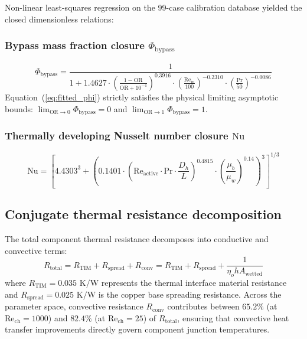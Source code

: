 Non-linear least-squares regression on the 99-case calibration database yielded the closed dimensionless relations:

\subsubsection{Bypass mass fraction closure $\Phi_{\mathrm{bypass}}$}
\begin{equation}
\Phi_{\mathrm{bypass}} = \frac{1}{1 + 1.4627 \cdot \left(\frac{1 - \mathrm{OR}}{\mathrm{OR} + 10^{-4}}\right)^{0.3916} \cdot \left(\frac{\mathrm{Re}_{\mathrm{in}}}{100}\right)^{-0.2310} \cdot \left(\frac{\mathrm{Pr}}{50}\right)^{-0.0086}}
\label{eq:fitted_phi}
\end{equation}
Equation~(\ref{eq:fitted_phi}) strictly satisfies the physical limiting asymptotic bounds: $\lim_{\mathrm{OR}\to 0}\Phi_{\mathrm{bypass}} = 0$ and $\lim_{\mathrm{OR}\to 1}\Phi_{\mathrm{bypass}} = 1$.

\subsubsection{Thermally developing Nusselt number closure $\mathrm{Nu}$}
\begin{equation}
\mathrm{Nu} = \left[ 4.4303^3 + \left( 0.1401 \cdot \left(\mathrm{Re}_{\mathrm{active}} \cdot \mathrm{Pr} \cdot \frac{D_h}{L}\right)^{0.4815} \cdot \left(\frac{\mu_b}{\mu_w}\right)^{0.14} \right)^3 \right]^{1/3}
\label{eq:fitted_nu}
\end{equation}

\subsection{Conjugate thermal resistance decomposition}
\label{sec:thermal_decomposition}

The total component thermal resistance decomposes into conductive and convective terms:
\begin{equation}
R_{\mathrm{total}} = R_{\mathrm{TIM}} + R_{\mathrm{spread}} + R_{\mathrm{conv}} = R_{\mathrm{TIM}} + R_{\mathrm{spread}} + \frac{1}{\eta_o h A_{\mathrm{wetted}}}
\label{eq:thermal_decomposition}
\end{equation}
where $R_{\mathrm{TIM}} = 0.035\text{ K/W}$ represents the thermal interface material resistance and $R_{\mathrm{spread}} = 0.025\text{ K/W}$ is the copper base spreading resistance. Across the parameter space, convective resistance $R_{\mathrm{conv}}$ contributes between $65.2\%$ (at $\mathrm{Re}_{\mathrm{ch}}=1000$) and $82.4\%$ (at $\mathrm{Re}_{\mathrm{ch}}=25$) of $R_{\mathrm{total}}$, ensuring that convective heat transfer improvements directly govern component junction temperatures.

